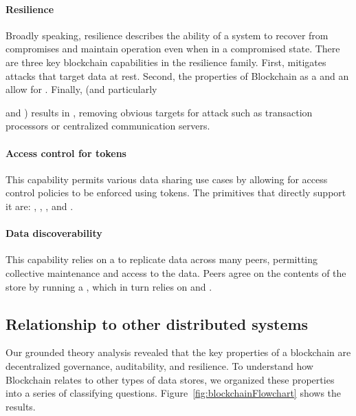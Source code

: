 \paragraph{Resilience} Broadly speaking, resilience describes the ability of a system to recover from compromises and maintain operation even when in a compromised state. There are three key blockchain capabilities in the resilience family. First,  mitigates attacks that target data at rest. Second, the properties of Blockchain as a  and an  allow for . Finally,  (and particularly { and ) results in , removing obvious targets for attack such as transaction processors or centralized communication servers.
	
	\paragraph{Access control for tokens} This capability permits various data sharing use cases by allowing for access control policies to be enforced using tokens. The primitives that directly support it are: , , , and .
	
	\paragraph{Data discoverability} This capability relies on a  to replicate data across many peers, permitting collective maintenance and access to the data. Peers agree on the contents of the store by running a , which in turn relies on  and . 






\subsection{Relationship to other distributed systems}
Our grounded theory analysis revealed that the key properties of a blockchain are decentralized governance, auditability, and resilience. To understand how Blockchain relates to other types of data stores, we organized these properties into a series of classifying questions. Figure~\ref{fig:blockchainFlowchart} shows the results.

}

